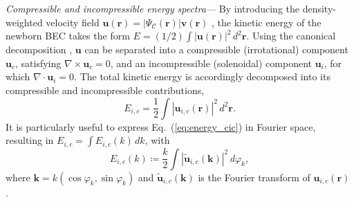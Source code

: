 \documentclass[aps,prl,twocolumn,showpacs,notitlepage,floatfix,superscriptaddress]{revtex4-1}
\begin{document}
{\it Compressible and incompressible energy spectra---}
By introducing the density-weighted velocity field $\boldsymbol{u}(\boldsymbol{r})=|\Psi_{\mathcal{C}}(\boldsymbol{r})|\boldsymbol{v}(\boldsymbol{r})$ \cite{Nore1997PRL,Nore97,Ogawa2002,Kobayashi2005}, the kinetic energy of the newborn BEC takes the form
$
E=
\left(
1
/ 2 \right)
\int |\boldsymbol{u}(\boldsymbol{r})|^2 \, d^2 \boldsymbol{r} .
$
Using the canonical decomposition \cite{Nore1997PRL,Nore97,Ogawa2002,Kobayashi2005}, $\boldsymbol{u}$ can be separated into a compressible (irrotational) component $\boldsymbol{u}_c$, satisfying $\nabla \times \boldsymbol{u}_c = 0$, and an incompressible (solenoidal) component $\boldsymbol{u}_{i}$, for which $\nabla \cdot \boldsymbol{u}_{i} = 0$. The total kinetic energy is accordingly decomposed into its compressible and incompressible contributions,
\begin{equation}
E_{i,c} = \frac{
1
}{2} \int |\boldsymbol{u}_{i,c}(\boldsymbol{r})|^2 \, d^2 \boldsymbol{r}.
\label{eq:energy_cic}
\end{equation}
It is particularly useful to express Eq.~(\ref{eq:energy_cic}) in Fourier space, resulting in
$E_{i,c} = \int E_{i,c}(k) \, d k$, with
\begin{equation}
E_{i,c}(k) \coloneqq
\frac{k}{2}
\int
|\boldsymbol{\tilde{u}}_{i, c} ( \boldsymbol{k} )|^{2} \, d \varphi_k,
\label{eq:energy_cic_fft}
\end{equation}
where $\boldsymbol{k} = k ( \cos \varphi_k, \sin \varphi_k )$ and $\boldsymbol{\tilde{u}}_{i,c}(\boldsymbol{k})$ is the Fourier transform of $\boldsymbol{u}_{i,c}(\boldsymbol{r})$ \cite{Bradley12}.
\end{document}
